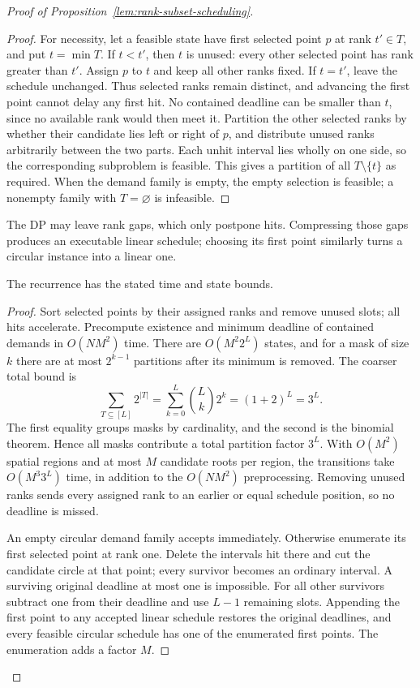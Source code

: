 \begin{proof}[Proof of Proposition~\ref{lem:rank-subset-scheduling}]
\begin{proof}
For necessity, let a feasible state have first selected point $p$
at rank $t'\in T$, and put $t=\min T$. If $t<t'$, then $t$ is
unused: every other selected point has rank greater than $t'$. Assign
$p$ to $t$ and keep all other ranks fixed. If $t=t'$, leave the
schedule unchanged. Thus selected ranks remain distinct, and advancing
the first point cannot delay any first hit.
No contained deadline can be smaller than $t$, since no available
rank would then meet it. Partition the other selected ranks by
whether their candidate lies left or right of $p$, and distribute
unused ranks arbitrarily between the two parts. Each unhit interval
lies wholly on one side, so the corresponding subproblem is feasible.
This gives a partition of all $T\setminus\{t\}$ as required.
When the demand family is empty, the empty selection is feasible; a
nonempty family with $T=\varnothing$ is infeasible.
\end{proof}
The DP may leave rank gaps, which only postpone hits. Compressing
those gaps produces an executable linear schedule; choosing its first
point similarly turns a circular instance into a linear one.

\begin{claim}
The recurrence has the stated time and state bounds.
\end{claim}
\begin{proof}
Sort selected points by their assigned ranks and remove unused slots;
all hits accelerate. Precompute existence and minimum deadline of
contained demands in $O(NM^2)$ time. There are $O(M^2 2^L)$ states,
and for a mask of size $k$ there are at most $2^{k-1}$
partitions after its minimum is removed. The coarser total bound is
\[
 \sum_{T\subseteq[L]}2^{|T|}
 =\sum_{k=0}^L\binom Lk2^k=(1+2)^L=3^L.
\]
The first equality groups masks by cardinality, and the second is
the binomial theorem. Hence all masks contribute a total partition
factor $3^L$. With $O(M^2)$ spatial regions and at most $M$ candidate
roots per region, the transitions take $O(M^3 3^L)$ time, in addition
to the $O(NM^2)$ preprocessing. Removing unused ranks sends every
assigned rank to an earlier or equal schedule position, so no deadline
is missed.

An empty circular demand family accepts immediately. Otherwise
enumerate its first selected point at rank one. Delete the intervals
hit there and cut the candidate circle at that point; every survivor
becomes an ordinary interval. A surviving original deadline at most
one is impossible. For all other survivors subtract one from their
deadline and use $L-1$ remaining slots. Appending the first point
to any accepted linear schedule restores the original deadlines,
and every feasible circular schedule has one of the enumerated first
points. The enumeration adds a factor $M$.
\end{proof}
\end{proof}

